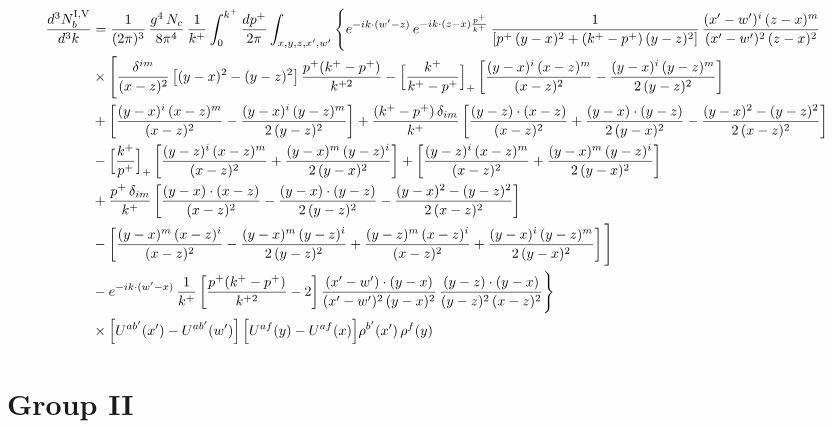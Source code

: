 \documentclass[9pt]{article}
\numberwithin{equation}{section}
\begin{document}
\begin{align}
\frac{d^{3}N^{\rm I,V}_{b}}{d^{3}k} & =\frac{1}{(2\pi)^{3}}\,\frac{g^{4}\,N_{c}}{8\pi^{4}}\,\frac{1}{k^{+}}\int_{0}^{k^{+}}\frac{dp^{+}}{2\pi}\int_{x,y,z,x',w'}\Bigg\{e^{-ik\cdot(w'-z)}\,e^{-ik\cdot(z-x)\frac{p^{+}}{k^{+}}}\,\frac{1}{\left[p^{+}\,(y-x)^{2}+(k^{+}-p^{+})\,(y-z)^{2}\right]}\,\frac{(x'-w')^{i}\,(z-x)^{m}}{(x'-w')^{2}\,(z-x)^{2}}\notag\\
&\times\Bigg[\frac{\delta^{im}}{(x-z)^{2}}\left[(y-x)^{2}-(y-z)^{2}\right]\frac{p^{+}(k^{+}-p^{+})}{k^{+2}}
-\Big[\frac{k^{+}}{k^{+}-p^{+}}\Big]_{+}\left[\frac{(y-x)^{i}\,(x-z)^{m}}{(x-z)^{2}}-\frac{(y-x)^{i}\,(y-z)^{m}}{2\,(y-z)^{2}}\right]\notag\\
&+\left[\frac{(y-x)^{i}\,(x-z)^{m}}{(x-z)^{2}}-\frac{(y-x)^{i}\,(y-z)^{m}}{2\,(y-z)^{2}}\right]
+\frac{(k^{+}-p^{+})\,\delta_{im}}{k^{+}}\left[\frac{(y-z)\cdot(x-z)}{(x-z)^{2}}+\frac{(y-x)\cdot(y-z)}{2\,(y-x)^{2}}-\frac{(y-x)^{2}-(y-z)^{2}}{2\,(x-z)^{2}}\right]\notag\\
&-\Big[\frac{k^{+}}{p^{+}}\Big]_{+}\left[\frac{(y-z)^{i}\,(x-z)^{m}}{(x-z)^{2}}+\frac{(y-x)^{m}\,(y-z)^{i}}{2\,(y-x)^{2}}\right]+\left[\frac{(y-z)^{i}\,(x-z)^{m}}{(x-z)^{2}}+\frac{(y-x)^{m}\,(y-z)^{i}}{2\,(y-x)^{2}}\right]\notag\\
&+\frac{p^{+}\,\delta_{im}}{k^{+}}\left[\frac{(y-x)\cdot(x-z)}{(x-z)^{2}}-\frac{(y-x)\cdot(y-z)}{2\,(y-z)^{2}}-\frac{(y-x)^{2}-(y-z)^{2}}{2\,(x-z)^{2}}\right]\notag\\
&-\left[\frac{(y-x)^{m}\,(x-z)^{i}}{(x-z)^{2}}-\frac{(y-x)^{m}\,(y-z)^{i}}{2\,(y-z)^{2}}+\frac{(y-z)^{m}\,(x-z)^{i}}{(x-z)^{2}}+\frac{(y-x)^{i}\,(y-z)^{m}}{2\,(y-x)^{2}}\right]\Bigg]\notag\\
&-e^{-ik\cdot(w'-x)}\,\frac{1}{k^{+}}\left[\frac{p^{+}(k^{+}-p^{+})}{k^{+2}}-2\right]\frac{(x'-w')\cdot(y-x)}{(x'-w')^{2}\,(y-x)^{2}}\,\frac{(y-z)\cdot(y-x)}{(y-z)^{2}\,(x-z)^{2}}\Bigg\}\notag\\
&\times\Big[U^{ab'}(x')-U^{ab'}(w')\Big]\,\Big[U^{af}(y)-U^{af}(x)\Big]\rho^{b'}(x')\,\rho^{f}(y)
\end{align}

\section{Group II}
\end{document}
